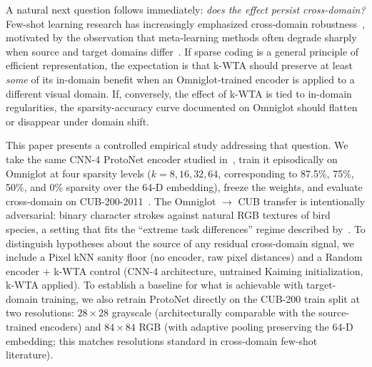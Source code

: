 \documentclass[11pt]{article}
\begin{document}
A natural next question follows immediately: \emph{does the effect persist cross-domain?} Few-shot learning research has increasingly emphasized cross-domain robustness~\citep{triantafillou2020meta,tseng2020cross,chen2019closer}, motivated by the observation that meta-learning methods often degrade sharply when source and target domains differ~\citep{phoo2021self}. If sparse coding is a general principle of efficient representation, the expectation is that k-WTA should preserve at least \emph{some} of its in-domain benefit when an Omniglot-trained encoder is applied to a different visual domain. If, conversely, the effect of k-WTA is tied to in-domain regularities, the sparsity-accuracy curve documented on Omniglot should flatten or disappear under domain shift.

This paper presents a controlled empirical study addressing that question. We take the same CNN-4 ProtoNet encoder studied in~\citet{pinho2026kwta}, train it episodically on Omniglot at four sparsity levels ($k = 8, 16, 32, 64$, corresponding to 87.5\%, 75\%, 50\%, and 0\% sparsity over the 64-D embedding), freeze the weights, and evaluate cross-domain on CUB-200-2011~\citep{wah2011caltech}. The Omniglot $\rightarrow$ CUB transfer is intentionally adversarial: binary character strokes against natural RGB textures of bird species, a setting that fits the ``extreme task differences'' regime described by~\citet{phoo2021self}. To distinguish hypotheses about the source of any residual cross-domain signal, we include a Pixel kNN sanity floor (no encoder, raw pixel distances) and a Random encoder + k-WTA control (CNN-4 architecture, untrained Kaiming initialization, k-WTA applied). To establish a baseline for what is achievable with target-domain training, we also retrain ProtoNet directly on the CUB-200 train split at two resolutions: $28 \times 28$ grayscale (architecturally comparable with the source-trained encoders) and $84 \times 84$ RGB (with adaptive pooling preserving the 64-D embedding; this matches resolutions standard in cross-domain few-shot literature).
\end{document}

